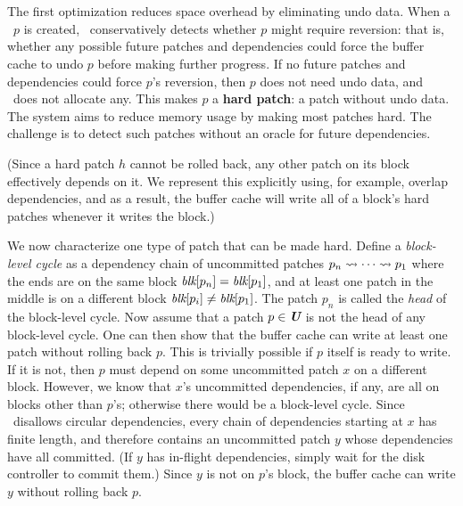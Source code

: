 
\subsection{\Nrb\ \Patches}
\label{sec:patch:nrb}

The first optimization reduces space overhead by
eliminating undo data.
%
When a \patch\ $p$ is created, \Kudos\ conservatively detects whether $p$
 might require reversion:
%
that is, whether any possible future patches and dependencies could force
 the buffer cache to undo $p$ before making further progress.
%
If no future patches and dependencies could force
 $p$'s reversion, then $p$ does not need undo data, and \Kudos\ does not
 allocate any.
%
This makes $p$ a \textbf{hard patch}: a patch without undo data.
%
The system aims to reduce memory usage by making most patches hard.
%
The challenge is to detect such patches without
 an oracle for future dependencies.
%


%
(Since a hard patch $h$ cannot be rolled back, any other patch on its block
 effectively depends on it.
%
We represent this explicitly using, for example, overlap dependencies, and
%
as a result, the buffer cache will write all of a block's hard patches
 whenever it writes the block.)


We now characterize one type of patch that can be made hard.
%
Define a \emph{block-level cycle} as a dependency chain of uncommitted
 patches $p_n \leadsto \cdots \leadsto p_1$ where the ends are on the same
 block $\textit{blk}[{p_n}] = \textit{blk}[{p_1}]$, and at least one patch in the middle
 is on a different block $\textit{blk}[{p_i}] \neq \textit{blk}[{p_1}]$.
%
The patch $p_n$ is called the \emph{head} of the block-level cycle.
%
Now assume that a patch $p \in \PMem$ is not the head of any block-level
 cycle.
%
One can then show that the buffer cache can write at least one patch
 without rolling back $p$.
%
This is trivially possible if $p$ itself is ready to write.
%
If it is not, then $p$ must depend on some uncommitted patch $x$ on a different
 block.
%
However, we know that $x$'s uncommitted dependencies, if any, are all on
 blocks other than $p$'s; otherwise there would be a block-level cycle.
%
Since \Featherstitch\ disallows circular dependencies, every
 chain of dependencies starting at $x$ has finite length, and therefore
 contains an uncommitted patch $y$ whose dependencies have all
 committed.
%
(If $y$ has in-flight dependencies, simply wait
 for the disk controller to commit them.)
%
Since $y$ is not on $p$'s block, the buffer cache can write $y$ without
 rolling back $p$.


